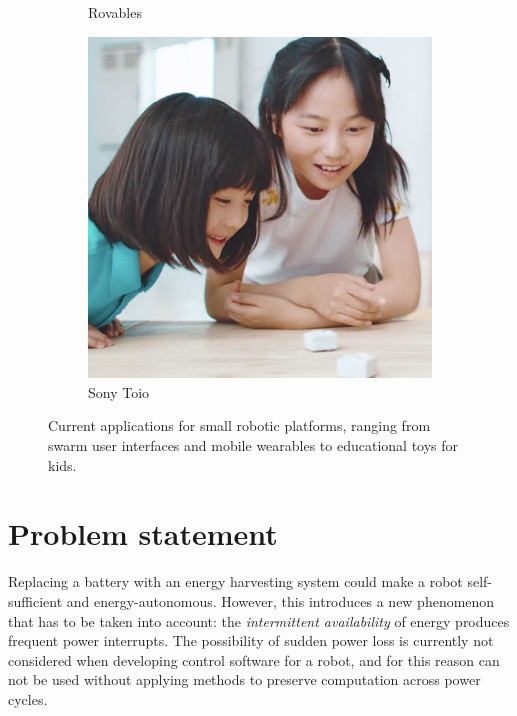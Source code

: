 \begin{figure}
\begin{subfigure}[b]{0.324\textwidth}
		\caption{Rovables~\cite{dementyev_uist_2016}}
		\label{fig:int_roverables}
	\end{subfigure}
	\begin{subfigure}[b]{0.323\textwidth}
		\includegraphics[width=\textwidth]{pics/toio.jpg}
		\caption{Sony Toio~\cite{sony_toio_2017}}
		\label{fig:int_toio}
	\end{subfigure}
	\caption{Current applications for small robotic platforms, ranging from swarm user interfaces and mobile wearables to educational toys for kids.}
	\label{fig:int_example_sui}
\end{figure}

\section{Problem statement}




Replacing a battery with an energy harvesting system could make a robot self-sufficient and energy-autonomous. 
However, this introduces a new phenomenon that has to be taken into account: the \emph{intermittent availability} of energy produces frequent power interrupts.
The possibility of sudden power loss is currently not considered when developing control software for a robot, and for this reason can not be used without applying methods to preserve computation across power cycles.%

